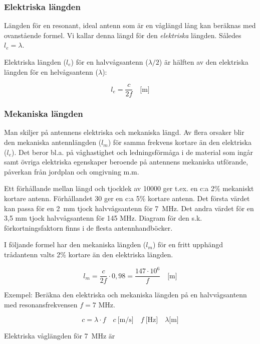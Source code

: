 \subsubsection{Elektriska längden}

Längden för en resonant, ideal antenn som är en våglängd lång kan
beräknas med ovanstående formel. Vi kallar denna längd för den
\emph{elektriska} längden. Således \(l_e = \lambda\).

Elektriska längden (\(l_e\)) för en halvvågsantenn (\(\lambda/2\))
är hälften av den elektriska längden för en helvågsantenn
(\(\lambda\)):

\[l_e = \frac{c}{2f} \quad \text{[m]}\]

\subsubsection{Mekaniska längden}

Man skiljer på antennens elektriska och mekaniska längd. Av flera
orsaker blir den mekaniska antennlängden (\(l_m\)) för samma
frekvens kortare än den elektriska (\(l_e\)). Det beror bl.a. på
våghastighet och ledningsförmåga i de material som ingår samt övriga
elektriska egenskaper beroende på antennens mekaniska utförande,
påverkan från jordplan och omgivning m.m.

Ett förhållande mellan längd och tjocklek av 10000 ger t.ex. en c:a
2\% mekaniskt kortare antenn. Förhållandet 30 ger en c:a 5\% kortare
antenn. Det första värdet kan passa för en 2~mm tjock halvvågsantenn
för 7~MHz. Det andra värdet för en 3,5 mm tjock halvvågsantenn för 145
MHz. Diagram för den s.k. förkortningsfaktorn finns i de flesta
antennhandböcker.

I följande formel har den mekaniska längden (\(l_m\)) för en fritt upphängd
trådantenn valts 2\% kortare än den elektriska längden.

\[l_m = \frac{c}{2f} \cdot 0,98 = \frac{147\cdot 10^6}{f} \quad \text{[m]}\]

Exempel: Beräkna den elektriska och mekaniska längden på en halvvågsantenn med
resonansfrekvensen \(f = 7\) MHz.

\[
c = \lambda \cdot f
\quad c\ \text{[m/s]} \quad f\ \text{[Hz]} \quad \lambda \text{[m]}
\]

Elektriska våglängden för 7~MHz är

